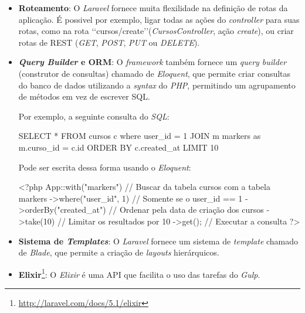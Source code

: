 \begin{itemize}
  \item \textbf{Roteamento}: O \textit{Laravel} fornece muita flexilidade na definição de rotas da aplicação. É possivel por exemplo, ligar todas as ações do \textit{controller} para suas rotas, como na rota \lq\lq cursos/create\rq\rq (\textit{CursosController}, ação \textit{create}), ou criar rotas de \ac{REST} (\textit{GET}, \textit{POST}, \textit{PUT} ou \textit{DELETE}).
  \item \textbf{\textit{Query Builder} e \ac{ORM}}: O \textit{framework} também fornece um \textit{query builder} (construtor de consultas) chamado de \textit{Eloquent}, que permite criar consultas do banco de dados utilizando a \textit{syntax} do \textit{PHP}, permitindo um agrupamento de métodos em vez de escrever \ac{SQL}.

  Por exemplo, a seguinte consulta do \textit{SQL}:
  \begin{listing}
    \begin{sqlcode}
      SELECT * FROM cursos c where user_id = 1
      JOIN m markers as m.curso_id = c.id
      ORDER BY c.created_at
      LIMIT 10
    \end{sqlcode}
    \caption{Busca simples do SQL. Buscar todos os cursos em que o user\_id seja igual a 1, unir os resultados com a tabela markers, ordenar pela data de criação do curso, e limitar os resultados por 10}
    \label{lst:sql_example_eloquent}
  \end{listing}

  Pode ser escrita dessa forma usando o \textit{Eloquent}:
  \begin{listing}
    \begin{phpcode}
      <?php
      App\Curso::with("markers") // Buscar da tabela cursos com a tabela markers
      ->where("user_id", 1) // Somente se o user_id == 1
      ->orderBy("created_at") // Ordenar pela data de criação dos cursos
      ->take(10) // Limitar os resultados por 10
      ->get(); // Executar a consulta
      ?>
    \end{phpcode}
    \caption{Consulta \ref{lst:sql_example_eloquent} em Eloquent}
    \label{lst:php_example_eloquent}
  \end{listing}

  \item \textbf{Sistema de \textit{Templates}}: O \textit{Laravel} fornece um sistema de \textit{template} chamado de \textit{Blade}, que permite a criação de \textit{layouts} hierárquicos.
  \item \textbf{Elixir}\footnote{\url{http://laravel.com/docs/5.1/elixir}}: O \textit{Elixir} é uma \ac{API} que facilita o uso das tarefas do \textit{Gulp}.
\end{itemize}

